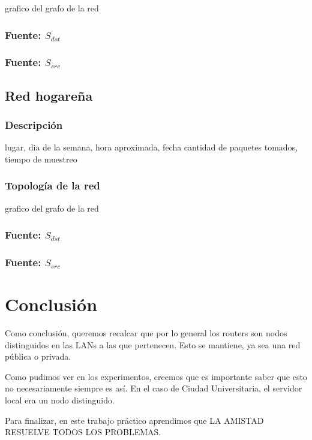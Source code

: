 \documentclass[10pt, a4paper]{article}
\begin{document}
grafico del grafo de la red

\subsubsection{Fuente: $S_{dst}$}

\subsubsection{Fuente: $S_{src}$}

\subsection{Red hogareña}

\subsubsection{Descripción}

lugar, dia de la semana, hora aproximada, fecha
cantidad de paquetes tomados, tiempo de muestreo

\subsubsection{Topología de la red}

grafico del grafo de la red

\subsubsection{Fuente: $S_{dst}$}

\subsubsection{Fuente: $S_{src}$}

\section{Conclusión}
Como conclusión, queremos recalcar que por lo general los routers son nodos distinguidos en las LANs a las que pertenecen. Esto se mantiene, ya sea una red pública o privada.

Como pudimos ver en los experimentos, creemos que es importante saber que esto no necesariamente siempre es así. En el caso de Ciudad Universitaria, el servidor local era un nodo distinguido.

Para finalizar, en este trabajo práctico aprendimos que LA AMISTAD RESUELVE TODOS LOS PROBLEMAS.
\end{document}
